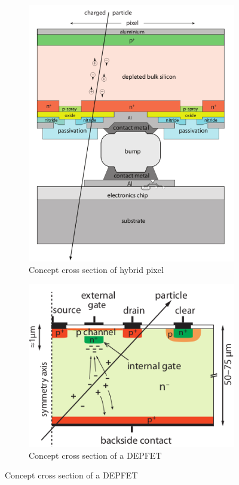    \begin{figure}
      \begin{subfigure}{.5\textwidth}
      \centering
      \includegraphics[width=.6\linewidth]{figures/Pixel_detectors/hybrid_scheme.png}
      \caption{Concept cross section of hybrid pixel}
      \label{fig:hybrid_scheme}
      \end{subfigure}%
      \begin{subfigure}{.5\textwidth}
      \centering
      \includegraphics[width=.8\linewidth]{figures/Pixel_detectors/DEPFET_scheme.png}
      \caption{Concept cross section of a DEPFET}
      \label{fig:DEPFET_scheme}
      \end{subfigure}
   \end{figure} 


